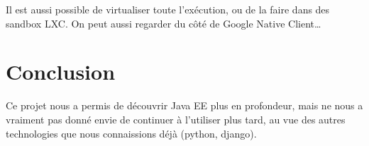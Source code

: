 \documentclass[10pt]{scrartcl}
\begin{document}
  Il est aussi possible de virtualiser toute l'exécution, ou de la faire dans des sandbox LXC. On peut aussi regarder du
  côté de Google Native Client\ldots

\section{Conclusion}
  Ce projet nous a permis de découvrir Java EE plus en profondeur, mais ne nous
  a vraiment pas donné envie de continuer à l'utiliser plus tard, au vue des
  autres technologies que nous connaissions déjà (python, django).
\end{document}
